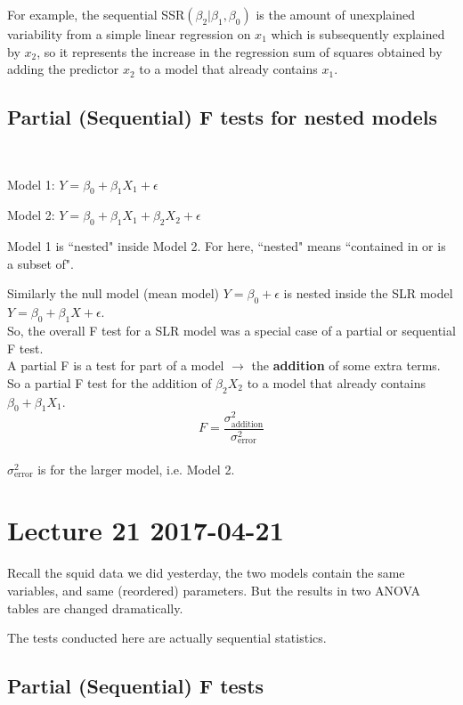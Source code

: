 \documentclass[a4paper, 11pt, twoside]{article}
\begin{document}
For example, the sequential SSR$(\beta_2|\beta_1, \beta_0)$ is the amount of unexplained variability from a simple linear regression on $x_1$ which is subsequently explained by $x_2$, so it represents the increase in the regression sum of squares obtained by adding the predictor $x_2$ to a model that already contains $x_1$.\\

\subsection{Partial (Sequential) F tests for nested models}\

Model 1: $Y=\beta_0+\beta_1X_1+\epsilon$

Model 2: $Y=\beta_0+\beta_1X_1+\beta_2X_2+\epsilon$

Model 1 is ``nested" inside Model 2. For here, ``nested" means ``contained in or is a subset of".

Similarly the null model (mean model) $Y=\beta_0+\epsilon$ is nested inside the SLR model $Y=\beta_0+\beta_1X+\epsilon$.\\

So, the overall F test for a SLR model was a special case of a partial or sequential F test.\\

A partial F is a test for part of a model $\rightarrow$ the \textbf{addition} of some extra terms.\\

So a partial F test for the addition of $\beta_2X_2$ to a model that already contains $\beta_0+\beta_1X_1$.\\

\[F=\frac{\sigma^2_{\text{addition}}}{\sigma^2_{\text{error}}}\]\\

$\sigma^2_{\text{error}}$ is for the larger model, i.e. Model 2.

\section{Lecture 21 2017-04-21}

Recall the squid data we did yesterday, the two models contain the same variables, and same (reordered) parameters. But the results in two ANOVA tables are changed dramatically.

The tests conducted here are actually sequential statistics.

\subsection{Partial (Sequential) F tests}\
\end{document}
